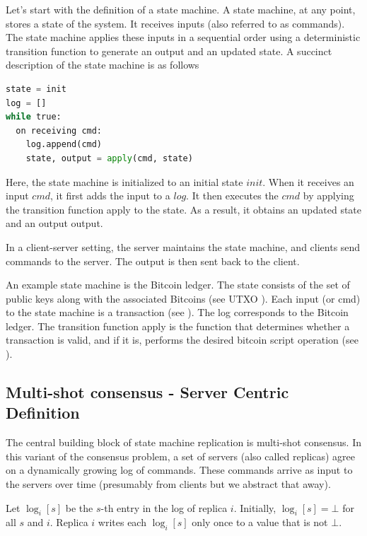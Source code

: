 Let's start with the definition of a state machine.
A state machine, at any point, stores a state of the system.
It receives inputs (also referred to as commands). 
The state machine applies these inputs in a sequential order using a deterministic
transition function to generate an output and an updated state.
A succinct description of the state machine is as follows

\label{smrdef}
  \begin{lstlisting}[language=Python,
    caption={fft algorithm in python}
  ]
state = init
log = []
while true:
  on receiving cmd:
    log.append(cmd)
    state, output = apply(cmd, state)
\end{lstlisting}

Here, the state machine is initialized to an initial state $init$.
When it receives an input $cmd$, it first adds the input to a $log$. 
It then executes the $cmd$ by applying the transition function apply to the state. As a result, it obtains an updated state and an output output.

In a client-server setting, the server maintains the state machine,
 and clients send commands to the server. 
 The output is then sent back to the client.

An example state machine is the Bitcoin ledger. 
The state consists of the set of public keys along with the associated 
Bitcoins (see UTXO ). 
Each input (or cmd) to the state machine is a transaction 
(see ).
The log corresponds to the Bitcoin ledger. 
The transition function apply is the function that determines whether a 
transaction is valid, and if it is, 
performs the desired bitcoin script operation (see ).

\subsection{Multi-shot consensus - Server Centric Definition}
The central building block of state machine replication is multi-shot consensus.
In this variant of the consensus problem, a set of servers (also called replicas)
 agree on a dynamically growing log of commands.
 These commands arrive as input to the servers over time 
 (presumably from clients but we abstract that away).

Let $\log_i[s]$ be the $s$-th entry in the log of replica $i$. 
Initially, $\log_i[s]=\bot$ for all $s$ and $i$. 
Replica $i$ writes each $\log_i[s]$ only once to a value that is not 
$\bot$.

